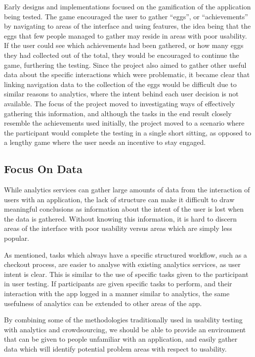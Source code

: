 Early designs and implementations focused on the gamification of the application
being tested. The game encouraged the user to gather ``eggs'', or ``achievements''
by navigating to areas of the interface and using features, the idea being that
the eggs that few people managed to gather may reside in areas with poor usability.
If the user could see which achievements had been gathered, or how many eggs
they had collected out of the total, they would be encouraged to continue the
game, furthering the testing.
Since the project also aimed to gather other useful data about the specific
interactions which were problematic, it became clear that linking navigation
data to the collection of the eggs would be difficult due to similar reasons
to analytics, where the intent behind each user decision is not available.
The focus of the project moved to investigating ways of effectively gathering
this information, and although the tasks in the end result closely resemble
the achievements used initially, the project moved to a scenario where the
participant would complete the testing in a single short sitting, as opposed
to a lengthy game where the user needs an incentive to stay engaged.

\subsection{Focus On Data}

While analytics services can gather large amounts of data from the interaction
of users with an application, the lack of structure can make it difficult to
draw meaningful conclusions as information about the intent of the user is lost
when the data is gathered.  Without knowing this information, it is hard to
discern areas of the interface with poor usability versus areas which are
simply less popular.

As mentioned, tasks which always have a specific structured workflow, such as a checkout
process, are easier to analyse with existing analytics services, as user intent
is clear. This is similar to the use of specific tasks given to the participant
in user testing. If participants are given specific tasks to perform, and their
interaction with the app logged in a manner similar to analytics, the same
usefulness of analytics can be extended to other areas of the app.

By combining some of the methodologies traditionally used in usability testing
with analytics and crowdsourcing, we should be able to provide an environment
that can be given to people unfamiliar with an application, and easily
gather data which will identify potential problem areas with respect to
usability.

